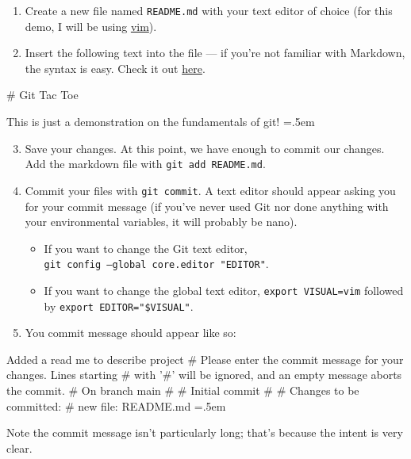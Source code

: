 \documentclass[12pt]{article}
\newenvironment{lcverbatim}
 {\SaveVerbatim{cverb}}
 {\endSaveVerbatim
  \flushleft\fboxrule=0pt\fboxsep=.5em
  \scriptsize
  \colorbox{cverbbg}{%
    \makebox[\dimexpr\linewidth-2\fboxsep][l]{\BUseVerbatim{cverb}}%
  }
  \endflushleft
}
\newcommand{\shellcmd}[1]{\texttt{\colorbox{gray!30}{#1}}}
\begin{document}
\begin{enumerate}
    \item Create a new file named \texttt{README.md} with your text editor of choice (for this demo, I will be using \href{http://www.vim.org}{vim}).
    \item Insert the following text into the file --- if you're not familiar with Markdown, the syntax is easy. Check it out \href{https://guides.github.com/features/mastering-markdown/}{here}.
\end{enumerate}

\begin{lcverbatim}
# Git Tac Toe

This is just a demonstration on the fundamentals of git!
\end{lcverbatim}

\begin{enumerate}
    \setcounter{enumi}{2}
    \item Save your changes. At this point, we have enough to commit our changes. Add the markdown file with \shellcmd{git add README.md}.
    \item Commit your files with \shellcmd{git commit}. A text editor should appear asking you for your commit message (if you've never used Git nor done anything with your environmental variables, it will probably be nano).
    \begin{itemize}
        \item If you want to change the Git text editor, \\ \shellcmd{git config --global core.editor "EDITOR"}.
        \item If you want to change the global text editor, \shellcmd{export VISUAL=vim} followed by \shellcmd{export EDITOR="\$VISUAL"}.
    \end{itemize}

    \item You commit message should appear like so:
\end{enumerate}

\begin{lcverbatim}
Added a read me to describe project
# Please enter the commit message for your changes. Lines starting
# with '#' will be ignored, and an empty message aborts the commit.
# On branch main
#
# Initial commit
#
# Changes to be committed:
#       new file:   README.md
\end{lcverbatim}

\noindent Note the commit message isn't particularly long; that's because the intent is very clear.
\end{document}
